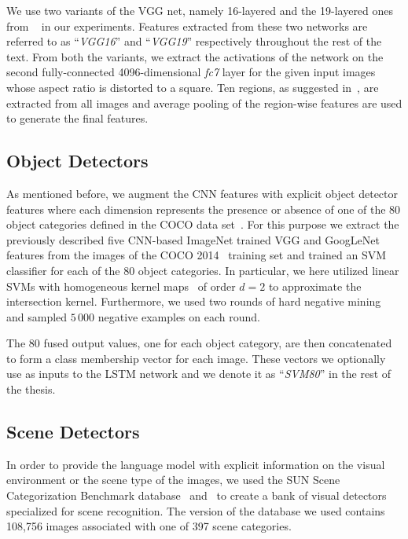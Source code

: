We use two variants of the VGG net, namely 16-layered and the 19-layered ones
from ~\cite{Simonyan14c} in our experiments.
Features extracted from these two networks are referred to as ``\emph{VGG16}''
and ``\emph{VGG19}'' respectively throughout the rest of the text.
From both the variants, we extract the activations of the network on the second
fully-connected 4096-dimensional \emph{fc7} layer for the given input images
whose aspect ratio is distorted to a square.
Ten regions, as suggested in~\cite{Krizhevsky2012}, are extracted from all
images and average pooling of the region-wise features are used to generate the
final features.

\subsection{Object Detectors}

As mentioned before,  we augment the CNN features with explicit object detector
features where each dimension represents the presence or absence of one of the
80 object categories defined in the COCO data set~\cite{Lin2014}.
For this purpose we extract the previously described five CNN-based ImageNet
trained VGG and GoogLeNet features from the images of the COCO
2014~\cite{Lin2014} training set and trained an SVM classifier for each of the
80 object categories.
In particular, we here utilized linear SVMs with homogeneous kernel
maps~\cite{Vedaldi2010} of order $d=2$ to approximate the intersection kernel.
Furthermore, we used two rounds of hard negative mining~\cite{Li2013} and
sampled $5\,000$ negative examples on each round.

The 80 fused output values, one for each object category, are then concatenated
to form a class membership vector for each image.
These vectors we optionally use as inputs to the LSTM network and we denote it
as ``\emph{SVM80}'' in the rest of the thesis.

\subsection{Scene Detectors}

In order to provide the language model with explicit information on the visual
environment or the scene type of the images, we used the SUN Scene
Categorization Benchmark database~\cite{Xiao2010} and~\cite{Xiao2014} to create
a bank of visual detectors specialized for scene recognition.
The version of the database we used contains 108,756 images associated with one
of 397 scene categories.

